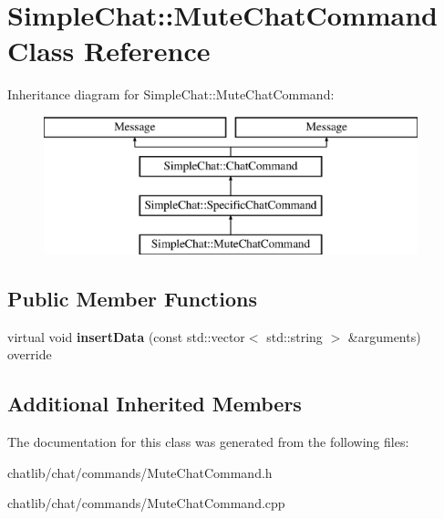 \hypertarget{classSimpleChat_1_1MuteChatCommand}{\section{Simple\-Chat\-:\-:Mute\-Chat\-Command Class Reference}
\label{classSimpleChat_1_1MuteChatCommand}
}
Inheritance diagram for Simple\-Chat\-:\-:Mute\-Chat\-Command\-:\begin{figure}[H]
\begin{center}
\leavevmode
\includegraphics[height=4.000000cm]{classSimpleChat_1_1MuteChatCommand}
\end{center}
\end{figure}
\subsection*{Public Member Functions}
\begin{DoxyCompactItemize}
\item 
\hypertarget{classSimpleChat_1_1MuteChatCommand_ae140c788f937655702e0d5329ce29724}{virtual void {\bfseries insert\-Data} (const std\-::vector$<$ std\-::string $>$ \&arguments) override}\label{classSimpleChat_1_1MuteChatCommand_ae140c788f937655702e0d5329ce29724}

\end{DoxyCompactItemize}
\subsection*{Additional Inherited Members}


The documentation for this class was generated from the following files\-:\begin{DoxyCompactItemize}
\item 
chatlib/chat/commands/Mute\-Chat\-Command.\-h\item 
chatlib/chat/commands/Mute\-Chat\-Command.\-cpp\end{DoxyCompactItemize}

